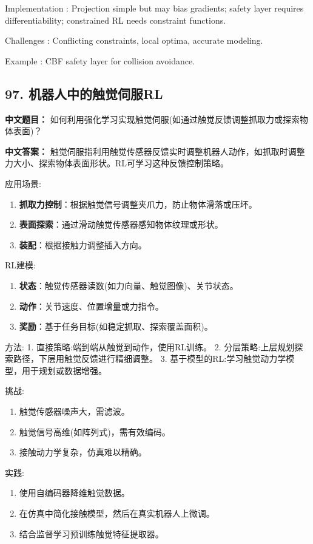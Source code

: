 \documentclass[10pt,a4paper]{ctexart}
\begin{document}
 Implementation : Projection simple but may bias gradients; safety layer requires differentiability; constrained RL needs constraint functions.

 Challenges : Conflicting constraints, local optima, accurate modeling.

 Example : CBF safety layer for collision avoidance.

\subsection*{97. 机器人中的触觉伺服RL}
\textbf{中文题目：} 如何利用强化学习实现触觉伺服(如通过触觉反馈调整抓取力或探索物体表面)？

\textbf{中文答案：}  
触觉伺服指利用触觉传感器反馈实时调整机器人动作，如抓取时调整力大小、探索物体表面形状。RL可学习这种反馈控制策略。

 应用场景:
\begin{enumerate}
    \item \textbf{抓取力控制}：根据触觉信号调整夹爪力，防止物体滑落或压坏。
    \item \textbf{表面探索}：通过滑动触觉传感器感知物体纹理或形状。
    \item \textbf{装配}：根据接触力调整插入方向。
\end{enumerate}

 RL建模:
\begin{enumerate}
    \item \textbf{状态}：触觉传感器读数(如力向量、触觉图像)、关节状态。
    \item \textbf{动作}：关节速度、位置增量或力指令。
    \item \textbf{奖励}：基于任务目标(如稳定抓取、探索覆盖面积)。
\end{enumerate}

 方法:
1.  直接策略:端到端从触觉到动作，使用RL训练。
2.  分层策略:上层规划探索路径，下层用触觉反馈进行精细调整。
3.  基于模型的RL:学习触觉动力学模型，用于规划或数据增强。

 挑战:
\begin{enumerate}
    \item 触觉传感器噪声大，需滤波。
    \item 触觉信号高维(如阵列式)，需有效编码。
    \item 接触动力学复杂，仿真难以精确。
\end{enumerate}

 实践:
\begin{enumerate}
    \item 使用自编码器降维触觉数据。
    \item 在仿真中简化接触模型，然后在真实机器人上微调。
    \item 结合监督学习预训练触觉特征提取器。
\end{enumerate}
\end{document}
